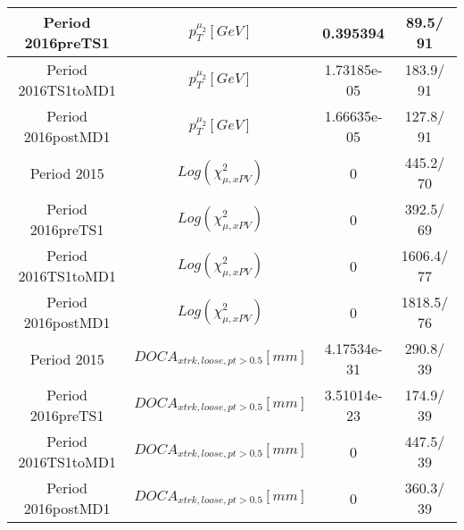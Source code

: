 \documentclass{article}
\begin{document}
\begin{longtable}{c|c|c|c}
\hline
 Period 2016preTS1 & $p_{T}^{\mu_{2}} [GeV]$ & 0.395394 &  89.5/ 91\\
\hline
 Period 2016TS1toMD1 & $p_{T}^{\mu_{2}} [GeV]$ & 1.73185e-05 & 183.9/ 91\\
\hline
 Period 2016postMD1 & $p_{T}^{\mu_{2}} [GeV]$ & 1.66635e-05 & 127.8/ 91\\
\hline
 Period 2015 & $Log(\chi^{2}_{\mu,xPV})$ & 0 & 445.2/ 70\\
\hline
 Period 2016preTS1 & $Log(\chi^{2}_{\mu,xPV})$ & 0 & 392.5/ 69\\
\hline
 Period 2016TS1toMD1 & $Log(\chi^{2}_{\mu,xPV})$ & 0 & 1606.4/ 77\\
\hline
 Period 2016postMD1 & $Log(\chi^{2}_{\mu,xPV})$ & 0 & 1818.5/ 76\\
\hline
 Period 2015 & $DOCA_{xtrk, loose, pt>0.5} [mm]$ & 4.17534e-31 & 290.8/ 39\\
\hline
 Period 2016preTS1 & $DOCA_{xtrk, loose, pt>0.5} [mm]$ & 3.51014e-23 & 174.9/ 39\\
\hline
 Period 2016TS1toMD1 & $DOCA_{xtrk, loose, pt>0.5} [mm]$ & 0 & 447.5/ 39\\
\hline
 Period 2016postMD1 & $DOCA_{xtrk, loose, pt>0.5} [mm]$ & 0 & 360.3/ 39\\
\hline
\end{longtable}
\end{document}
